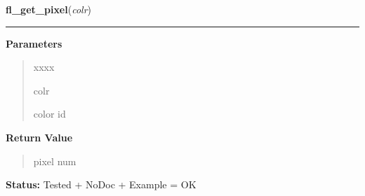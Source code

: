 \hspace{.8\funcindent}\begin{boxedminipage}{\funcwidth}

    \raggedright \textbf{fl\_get\_pixel}(\textit{colr})

    \vspace{-1.5ex}

    \rule{\textwidth}{0.5\fboxrule}
\setlength{\parskip}{2ex}
\setlength{\parskip}{1ex}
      \textbf{Parameters}
      \vspace{-1ex}

      \begin{quote}
        \begin{Ventry}{xxxx}

          \item[colr]

          color id

        \end{Ventry}

      \end{quote}

      \textbf{Return Value}
    \vspace{-1ex}

      \begin{quote}
      pixel num

      \end{quote}

\textbf{Status:} Tested + NoDoc + Example = OK



    \end{boxedminipage}

    \label{xformslib:library:fl_get_pixel}

    \vspace{0.5ex}

